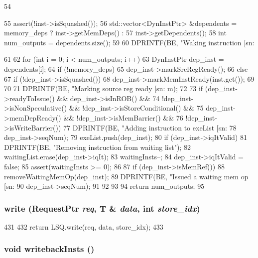 \begin{DoxyCode}
54 {
55     assert(!inst->isSquashed());
56     std::vector<DynInstPtr> &dependents = memory_deps ? inst->getMemDeps() :
57         inst->getDependents();
58     int num_outputs = dependents.size();
59 
60     DPRINTF(BE, "Waking instruction [sn:%
      
61 
62     for (int i = 0; i < num_outputs; i++) {
63         DynInstPtr dep_inst = dependents[i];
64         if (!memory_deps) {
65             dep_inst->markSrcRegReady();
66         } else {
67             if (!dep_inst->isSquashed())
68                 dep_inst->markMemInstReady(inst.get());
69         }
70 
71         DPRINTF(BE, "Marking source reg ready [sn:%
      m);
72 
73         if (dep_inst->readyToIssue() && dep_inst->isInROB() &&
74             !dep_inst->isNonSpeculative() && !dep_inst->isStoreConditional() &&
75             dep_inst->memDepReady() && !dep_inst->isMemBarrier() &&
76             !dep_inst->isWriteBarrier()) {
77             DPRINTF(BE, "Adding instruction to exeList [sn:%
78                     dep_inst->seqNum);
79             exeList.push(dep_inst);
80             if (dep_inst->iqItValid) {
81                 DPRINTF(BE, "Removing instruction from waiting list\n");
82                 waitingList.erase(dep_inst->iqIt);
83                 waitingInsts--;
84                 dep_inst->iqItValid = false;
85                 assert(waitingInsts >= 0);
86             }
87             if (dep_inst->isMemRef()) {
88                 removeWaitingMemOp(dep_inst);
89                 DPRINTF(BE, "Issued a waiting mem op [sn:%
90                         dep_inst->seqNum);
91             }
92         }
93     }
94     return num_outputs;
95 }
\end{DoxyCode}
\hypertarget{classLWBackEnd_abbf7bcc93511421a1787650a43e2642a}{
\subsubsection[{write}]{ write ({\bf RequestPtr} {\em req}, \/  T \& {\em data}, \/  int {\em store\_\-idx})}}
\label{classLWBackEnd_abbf7bcc93511421a1787650a43e2642a}



\begin{DoxyCode}
431 {
432     return LSQ.write(req, data, store_idx);
433 }
\end{DoxyCode}
\hypertarget{classLWBackEnd_a5e9a203f943b3a8a243ddc6d2a0a240d}{
\subsubsection[{writebackInsts}]{\setlength{\rightskip}{0pt plus 5cm}void writebackInsts ()}}
\label{classLWBackEnd_a5e9a203f943b3a8a243ddc6d2a0a240d}



